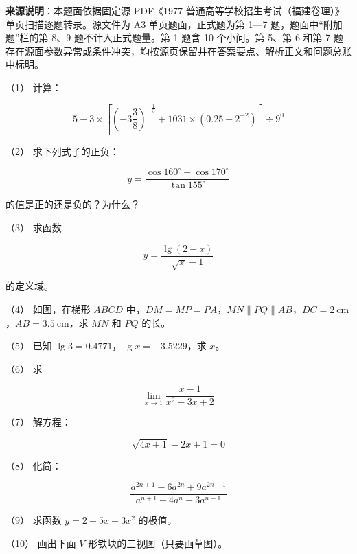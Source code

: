 


\begin{gktip}
\textbf{来源说明}：本题面依据固定源 PDF《1977 普通高等学校招生考试（福建卷理）》单页扫描逐题转录。源文件为 A3 单页题面，正式题为第 1—7 题，题面中“附加题”栏的第 8、9 题不计入正式题量。第 1 题含 10 个小问。第 5、第 6 和第 7 题存在源面参数异常或条件冲突，均按源页保留并在答案要点、解析正文和问题总账中标明。
\end{gktip}

\Needspace{0.4\textheight}
\begin{question}

（1） 计算：

\nopagebreak[4]
\[
5-3\times\left[\left(-3\frac38\right)^{-\frac13}+1031\times\left(0.25-2^{-2}\right)\right]\div9^0
\]

（2） 求下列式子的正负：

\nopagebreak[4]
\[
y=\frac{\cos160^\circ-\cos170^\circ}{\tan155^\circ}
\]

的值是正的还是负的？为什么？

（3） 求函数

\nopagebreak[4]
\[
y=\frac{\lg(2-x)}{\sqrt{x}-1}
\]

的定义域。

（4） 如图，在梯形 $ABCD$ 中，$DM=MP=PA$，$MN\parallel PQ\parallel AB$，$DC=2\ \mathrm{cm}$，$AB=3.5\ \mathrm{cm}$，求 $MN$ 和 $PQ$ 的长。
\nopagebreak[4]
\begin{center}\end{center}
\nopagebreak[4]
（5） 已知 $\lg3=0.4771$，$\lg x=-3.5229$，求 $x$。

（6） 求

\nopagebreak[4]
\[
\lim_{x\to1}\frac{x-1}{x^2-3x+2}
\]

（7） 解方程：

\nopagebreak[4]
\[
\sqrt{4x+1}-2x+1=0
\]

（8） 化简：

\nopagebreak[4]
\[
\frac{a^{2n+1}-6a^{2n}+9a^{2n-1}}{a^{n+1}-4a^n+3a^{n-1}}
\]

（9） 求函数 $y=2-5x-3x^2$ 的极值。

（10） 画出下面 $V$ 形铁块的三视图（只要画草图）。
\nopagebreak[4]
\begin{center}\end{center}
\nopagebreak[4]
\end{question}
